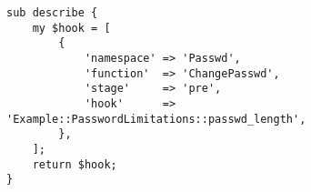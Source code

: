 \begin{verbatim}
sub describe {
    my $hook = [
        {
            'namespace' => 'Passwd',
            'function'  => 'ChangePasswd',
            'stage'     => 'pre',
            'hook'      => 'Example::PasswordLimitations::passwd_length',
        },
    ];
    return $hook;
}
\end{verbatim}
